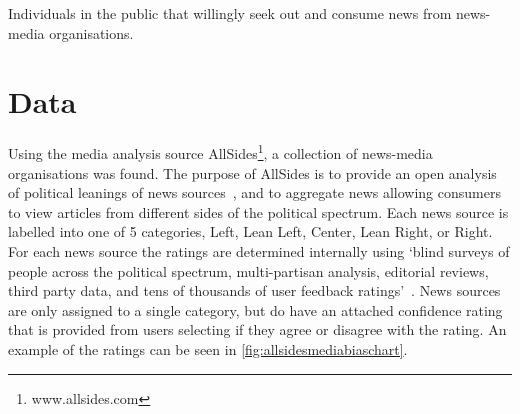 \begin{definition}[Consumers]
	Individuals in the public that willingly seek out and consume news from news-media organisations.
\end{definition}

\section{Data}

Using the media analysis source AllSides\footnote{www.allsides.com}, a collection of news-media organisations was found. The purpose of AllSides is to provide an open  analysis of political leanings of news sources~\cite{gable_media_2019}, and to aggregate news allowing consumers to view articles from different sides of the political spectrum. Each news source is labelled into one of 5 categories, {\color{Left}Left},
{\color{LeanLeft}Lean Left},
{\color{Center}Center},
{\color{LeanRight}Lean Right}, or
{\color{Right}Right}.
For each news source the ratings are determined internally using `blind surveys of people across the political spectrum, multi-partisan analysis, editorial reviews, third party data, and tens of thousands of user feedback ratings'~\cite{gable_media_2019}. News sources are only assigned to a single category, but do have an attached confidence rating that is provided from users selecting if they agree or disagree with the rating. An example of the ratings can be seen in \autoref{fig:allsidesmediabiaschart}.

